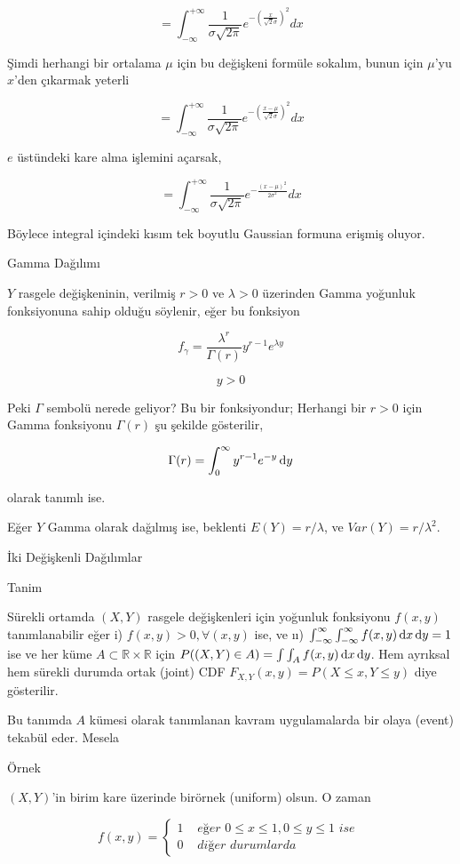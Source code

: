 \documentclass[12pt,fleqn]{article}\usepackage{../../common}
\begin{document}
$$ = \int _{-\infty}^{+\infty} 
\frac{1}{\sigma \sqrt{2\pi}} 
e^{-(\frac{x}{\sqrt{2} \sigma })^2} dx
$$

Şimdi herhangi bir ortalama $\mu$ için bu değişkeni formüle sokalım, bunun
için $\mu$'yu $x$'den çıkarmak yeterli

$$ = \int _{-\infty}^{+\infty} 
\frac{1}{\sigma \sqrt{2\pi}} 
e^{-(\frac{x-\mu}{\sqrt{2} \sigma })^2} dx
$$

$e$ üstündeki kare alma işlemini açarsak,

$$ = \int _{-\infty}^{+\infty} 
\frac{1}{\sigma \sqrt{2\pi}} 
e^{-  \frac{(x-\mu)^2}{2 \sigma^2 }} dx
$$

Böylece integral içindeki kısım tek boyutlu Gaussian formuna erişmiş
oluyor. 

Gamma Dağılımı

$Y$ rasgele değişkeninin, verilmiş $r>0$ ve $\lambda > 0$ üzerinden Gamma
yoğunluk fonksiyonuna sahip olduğu söylenir, eğer bu fonksiyon

$$ f_{\gamma} =  \frac{\lambda^r}{\Gamma(r)}y^{r-1}e^{\lambda y}$$

$$ y>0  $$

Peki $\Gamma$ sembolü nerede geliyor? Bu bir fonksiyondur; Herhangi bir
$r>0$ için Gamma fonksiyonu $\Gamma(r)$ şu şekilde gösterilir,

$$ \Gamma(r) = \int _{0}^{\infty}y^{r-1}e^{-y} \,\mathrm{d} y $$

olarak tanımlı ise. 

Eğer $Y$ Gamma olarak dağılmış ise, beklenti $E(Y) = r/\lambda$, ve $Var(Y)
= r/\lambda^2$. 

İki Değişkenli Dağılımlar 

Tanim

Sürekli ortamda $(X,Y)$ rasgele değişkenleri için yoğunluk fonksiyonu $f(x,y)$
tanımlanabilir eğer i) $f(x,y) > 0, \forall (x,y)$ ise, ve ıı) $\int _{
  -\infty}^{\infty} \int _{ -\infty}^{\infty} f(x,y) \,\mathrm{d} x \,\mathrm{d} y = 1$ ise ve her
küme $A \subset \mathbb{R} \times \mathbb{R}$ için $P((X,Y) \in A) = \int \int_A
f(x,y) \,\mathrm{d} x \,\mathrm{d} y$. Hem ayrıksal hem sürekli durumda ortak (joint) CDF
$F_{X,Y}(x,y) = P (X \le x, Y \le y)$ diye gösterilir.

Bu tanımda $A$ kümesi olarak tanımlanan kavram uygulamalarda bir olaya
(event) tekabül eder. Mesela

Örnek

$(X,Y)$'in birim kare üzerinde birörnek (uniform) olsun. O zaman 

$$ 
f(x,y) =
\left\{ \begin{array}{ll}
1 & \textit{ eğer }  0 \le x \le 1, 0 \le y \le 1  \textit{ ise }\\
0 & \textit{ diğer durumlarda }
\end{array} \right.
 $$
\end{document}
